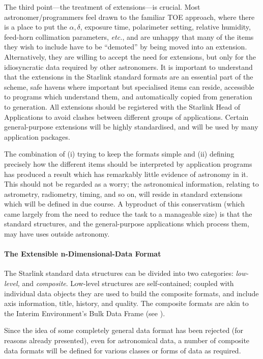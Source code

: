 The third point---the treatment of extensions---is
crucial.  Most astronomer/programmers feel drawn to the
familiar TOE approach, where
there is a place to put the $\alpha,\delta$, exposure time,
polarimeter setting,
relative humidity, feed-horn
collimation parameters, {\it etc.}, and are unhappy that
many of the items they wish to include have to be
``demoted'' by being
moved into an extension.  Alternatively, they are
willing to accept the need for extensions, but only for
the idiosyncratic data required
by other astronomers.  It is
important to understand that the extensions in the
Starlink standard formats are an essential part of
the scheme, safe havens where important but specialised
items can reside, accessible to programs which
understand them, and automatically copied from
generation to generation.  All extensions should be registered
with the Starlink Head of Applications to avoid
clashes between different groups of applications.  Certain
general-purpose extensions will be highly standardised, and
will be used by many application packages.

The combination of (i) trying to keep the formats simple and
(ii) defining precisely how the different items should be
interpreted by application programs has produced a result
which has remarkably little evidence of astronomy in it.  This
should not be regarded as a worry;  the astronomical
information, relating to astrometry, radiometry, timing,
and so on, will reside in standard extensions which will be defined
in due course.  A byproduct of this conservatism (which
came largely from the need to reduce the task to a
manageable size) is that the standard structures, and
the general-purpose applications which process them, may have uses
outside astronomy.

\paragraph{The Extensible n-Dimensional-Data Format}
The Starlink standard data structures can be divided into two 
categories:
{\it low-level,} and {\it composite}.  Low-level structures are
self-contained; coupled with
individual data objects they are used to build the composite
formats, and include axis information, title, history, and quality.
The composite formats are akin to the Interim
Environment's Bulk Data Frame (see ).

Since the idea of some completely general data format has
been rejected (for reasons already presented), even for
astronomical data, a number of composite data formats will be
defined for various classes or forms of data as required. 

